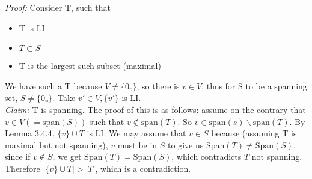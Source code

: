 \documentclass{report}
\theoremstyle{remark}
\theoremstyle{definition}
\theoremstyle{definition}
\theoremstyle{theorem}
\begin{document}
\emph{Proof:} Consider T, such that
\begin{itemize}
    \item T is LI
    \item $T \subset S$
    \item T is the largest such subset (maximal)
\end{itemize}
We have such a T because $V \neq \{0_v\}$, so there is $v \in V$, thus for S to be a spanning set, $S \neq \{0_v\}$. Take $v' \in V, \{v'\}$ is LI. \\
\emph{Claim:} T is spanning. The proof of this is as follows: assume on the contrary that $v \in V (= \text{span}(S))$ such that $v \notin \text{span}(T)$. So $v \in \text{span}(s) \backslash \text{span}(T)$. By Lemma 3.4.4, $\{v\} \cup T$ is LI. We may assume that $v \in S$ because (assuming T is maximal but not spanning), $v$ must be in $S$ to give us $\mathrm{Span}(T)\neq \mathrm{Span}(S)$, since if $v \notin S$, we get $\mathrm{Span}(T)=\mathrm{Span}(S)$, which contradicts $T$ not spanning. Therefore $|\{v\} \cup T| > |T|$, which is a contradiction.
\end{document}
